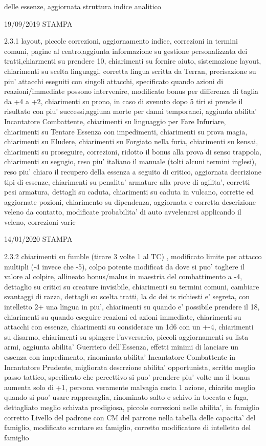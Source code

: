 \documentclass[a4paper,11pt,twoside,openany]{book}
\begin{document}
{delle essenze, aggiornata struttura indice analitico

19/09/2019 STAMPA

2.3.1 layout, piccole correzioni, aggiornamento indice, correzioni in termini comuni, pagine al centro,aggiunta informazione su gestione personalizzata dei tratti,chiarmenti su prendere 10, chiarimenti su fornire aiuto, sistemazione layout, chiarimenti su scelta linguaggi, corretta lingua scritta da Terran, precisazione su piu' attacchi eseguiti con singoli attacchi, specificato quando azioni di reazioni/immediate possono intervenire, modificato bonus per differenza di taglia da +4 a +2, chiarimenti su prono, in caso di svenuto dopo 5 tiri si prende il risultato con piu' successi,aggiuna morte per danni temporanei, aggiunta abilita' Incantatore Combattente, chiarimenti su linguaggio per Fare Infuriare, chiarimenti su Tentare Essenza con impedimenti, chiarimenti su prova magia, chiarimenti su Eludere, chiarimenti su Forgiato nella furia, chiarimenti su kensai, chiarimenti su proseguire, correzioni, ridotto il bonus alla prova di senso trappola, chiarimenti su segugio, reso piu' italiano il manuale (tolti alcuni termini inglesi), reso piu' chiaro il recupero della essenza a seguito di critico, aggiornata decrizione tipi di essenze, chiarimenti su penalita' armature alla prove di agilita', corretti pesi armatura, dettagli su caduta, chiarimenti su caduta in vulcano, corrette ed aggiornate pozioni, chiarimento su dipendenza, aggiornata e corretta descrizione veleno da contatto, modificate probabilita' di auto avvelenarsi applicando il veleno, correzioni varie

14/01/2020 STAMPA

2.3.2 chiarimenti su fumble (tirare 3 volte 1 al TC) , modificato limite per attacco multipli (-4 invece che -5), colpo potente modificat da dove si puo' togliere il valore al colpire, allineato bonus/malus in maestria del combattimento a -4, dettaglio su critici su creature invisibile, chiarimenti su termini comuni, cambiare svantaggi di razza, dettagli su scelta tratti, la dc dei ts richiesti e' segreta, con intelletto 2+ una lingua in piu', chiarimenti su quando e' possibile prendere il 18, chiarimenti su quando eseguire reazioni ed azioni immediate, chiarimenti su attacchi con essenze, chiarimenti su considerare un 1d6 con un +-4, chiarimenti su disarmo, chiarimenti su spingere l'avversario, piccoli aggiornamenti su lista armi, aggiunta abilita' Guerriero dell'Essenza, effetti minimi di lanciare un essenza con impedimento, rinominata abilita' Incantatore Combattente in Incantatore Prudente, migliorata descrzione abilita' opportunista, scritto meglio passo tattico, specificato che percettivo si puo' prendere piu' volte ma il bonus aumenta solo di +1, persona veramente malvagia costa 1 azione, chiarito meglio quando si puo' usare rappresaglia, rinominato salto e schivo in toccata e fuga, dettagliato meglio schivata prodigiosa, piccole correzioni nelle abilita', in famiglio corretto Livello del padrone con CM del patrone nella tabella delle capacita' del famiglio, modificato scrutare su famiglio, corretto modificatore di intelletto del famiglio

}
\end{document}
